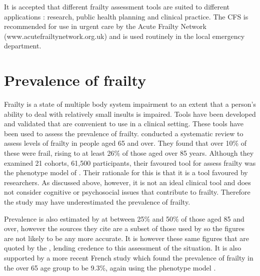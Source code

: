\documentclass
[
	12pt,
	a4paper,
	oneside,
]{report}
\begin{document}
It is accepted that different frailty assessment tools are suited to different
applications \parencite{ensrud:08,martin:08,romero-ortuno:16}: research, public
health planning and clinical practice. The CFS is recommended for use in urgent
care by the Acute Frailty Network (www.acutefrailtynetwork.org.uk) and is
used routinely in the local emergency department.

\section{Prevalence of frailty}
\label{sec:litrevprev}

Frailty is a state of multiple body system impairment to an extent that a
person's ability to deal with relatively small insults is impaired. Tools have 
been developed and validated that are convenient to use in a clinical setting.
These tools have been used to assess the prevalence of frailty. 
\textcite{collard:12} conducted a systematic review 
to assess levels of frailty in people aged 65 and over. They found that over
10\% of these were frail, rising to at least 26\% of those aged over 85 years.
Although they examined 21 cohorts, 61,500 participants, their favoured tool for 
assess frailty was the phenotype model of \textcite{fried:01}. Their rationale
for this is that it is a tool favoured by researchers. As discussed 
above, however, it is not an ideal clinical tool and does not consider cognitive or
psychosocial issues that contribute to frailty. Therefore the study may have 
underestimated the prevalence of frailty.

Prevalence is also estimated by \textcite{clegg:13} at between 25\% and 50\% of
those aged 85 and over, however the sources they cite are a subset of those
used by \textcite{collard:12} so the figures are not likely to be any more
accurate. It is however these same figures that are quoted by the
\textcite{bgs:14}, lending credence to this assessment of the situation. It
is also supported by a more recent French study which found the prevalence of
frailty in the over 65 age group to be 9.3\%, again using the phenotype model
\parencite{cossec:16}.
\end{document}
